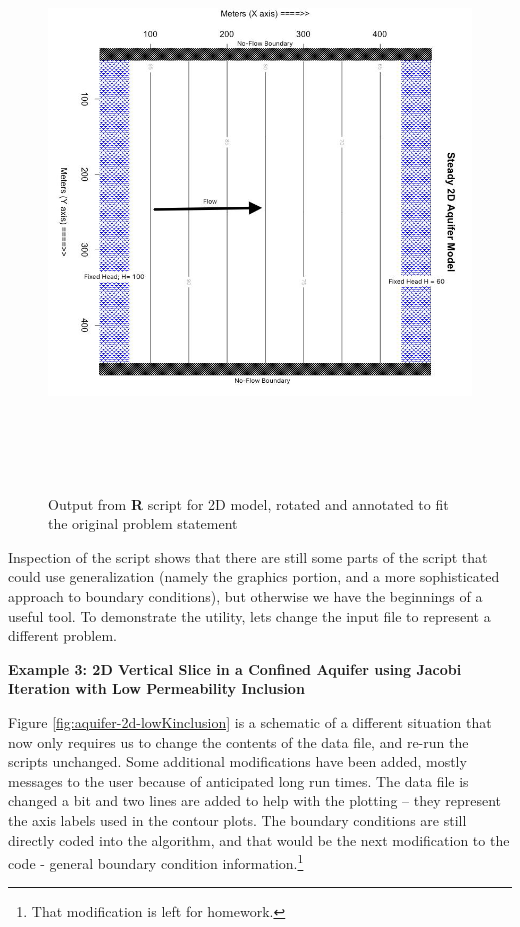 \begin{figure}[h!] %
   \centering
   \includegraphics[height=6in]{./17-SteadyGroundwaterFlow/aquifer-2d-contour2.jpg} 
   \caption{Output from \textbf{R} script for 2D model, rotated and annotated to fit the original problem statement}
   \label{fig:aquifer-2d-contour2}
\end{figure}

Inspection of the script shows that there are still some parts of the script that could use generalization (namely the graphics portion, and a more sophisticated approach to boundary conditions), but otherwise we have the beginnings of a useful tool.   
To demonstrate the utility, lets change the input file to represent a different problem.
\clearpage

\textbf{Example 3: 2D Vertical Slice in a Confined Aquifer using Jacobi Iteration with Low Permeability Inclusion}

Figure \ref{fig:aquifer-2d-lowKinclusion} is a schematic of a different situation that now only requires us to change the contents of the data file, and re-run the scripts unchanged.  
Some additional modifications have been added, mostly messages to the user because of anticipated long run times.    
The data file is changed a bit and two lines are added to help with the plotting -- they represent the axis labels used in the contour plots.
The boundary conditions are still directly coded into the algorithm, and that would be the next modification to the code - general boundary condition information.\footnote{That modification is left for homework.}


